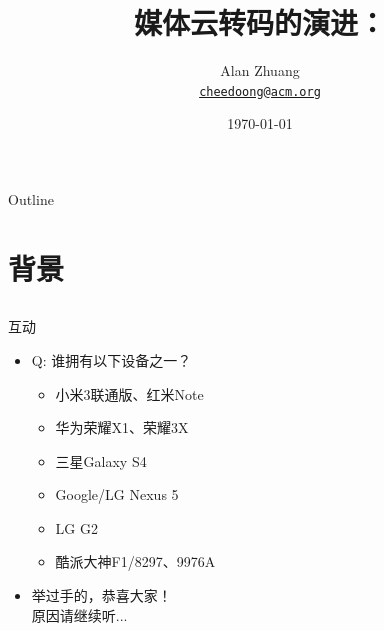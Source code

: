 \documentclass{beamer}
\title{媒体云转码的演进：\\\Small{MapReduce、DASH与稳定婚姻}}
\author{Alan Zhuang\\
\href{mailto:cheedoong@acm.org}{\nolinkurl{cheedoong@acm.org}}\\
}
\date{\today}
\begin{document}

\frame{\titlepage}

\section[Outline]{}
\begin{frame}{Outline}
\tableofcontents
\end{frame}

\section{背景}
\subsection{}
\begin{frame}{互动}
\begin{itemize}
\item Q: 谁拥有以下设备之一？
	\begin{itemize}
	\item 小米3联通版、红米Note
	\item 华为荣耀X1、荣耀3X
	\item 三星Galaxy S4
	\item Google/LG Nexus 5
	\item LG G2
	\item 酷派大神F1/8297、9976A
	\end{itemize}
\item  举过手的，恭喜大家！\\
原因请继续听...
\end{itemize}
\end{frame}
\end{document}
